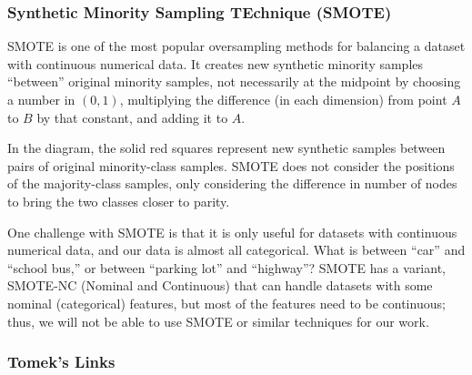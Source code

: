 \subsubsection{Synthetic Minority Sampling TEchnique (SMOTE)}

SMOTE \citep{00017602530000120020101} is one of the most popular oversampling methods for balancing a dataset with continuous numerical data.  It creates new synthetic minority samples ``between'' original minority samples, not necessarily at the midpoint by choosing a number in $(0,1)$, multiplying the difference (in each dimension) from point $A$ to $B$ by that constant, and adding it to $A$.

In the diagram, the solid red squares represent new synthetic samples between pairs of original minority-class samples.  SMOTE does not consider the positions of the majority-class samples, only considering the difference in number of nodes to bring the two classes closer to parity.  

\begin{center}
\end{center}

One challenge with SMOTE is that it is only useful for datasets with continuous numerical data, and our data is almost all categorical.  What is between ``car'' and ``school bus,'' or between ``parking lot'' and ``highway''?  SMOTE has a variant, SMOTE-NC (Nominal and Continuous) that can handle datasets with some nominal (categorical) features, but most of the features need to be continuous; thus, we will not be able to use SMOTE or similar techniques for our work.  


\subsubsection{Tomek's Links}

